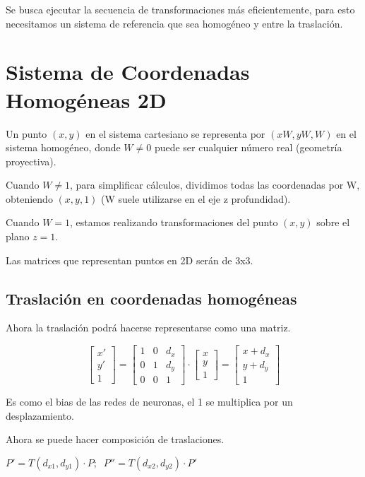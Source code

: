 Se busca ejecutar la secuencia de transformaciones más eficientemente, para esto necesitamos un sistema de referencia que sea homogéneo y entre la traslación.

\section{Sistema de Coordenadas Homogéneas 2D}
Un punto $( x , y )$ en el sistema cartesiano se representa por $( xW , yW , W )$ en el sistema homogéneo, donde $W\neq 0$ puede ser cualquier número real (geometría proyectiva).

Cuando $W\neq 1$, para simplificar cálculos, dividimos todas las coordenadas por W, obteniendo $( x , y , 1 )$ (W suele utilizarse en el eje z profundidad).

Cuando $W = 1$, estamos realizando transformaciones del punto $( x , y )$ sobre el plano $z = 1$.

Las matrices que representan puntos en 2D serán de 3x3.

\subsection{Traslación en coordenadas homogéneas}
Ahora la traslación podrá hacerse representarse como una matriz.

$$\left[\begin{matrix}
x' \\ y' \\ 1
\end{matrix}\right] =
\left[\begin{matrix}
1 & 0 & d_x \\ 0 & 1 & d_y \\ 0 & 0 & 1
\end{matrix}\right] \cdot
\left[\begin{matrix}
x \\ y \\ 1
\end{matrix}\right]=
\left[\begin{matrix}
x + d_x \\ y + d_y \\ 1
\end{matrix}\right]$$

Es como el bias de las redes de neuronas, el 1 se multiplica por un desplazamiento.

Ahora se puede hacer composición de traslaciones.

$P'=T(d_{x1},d_{y1}) \cdot P; \;\;P''=T(d_{x2},d_{y2}) \cdot P'$

